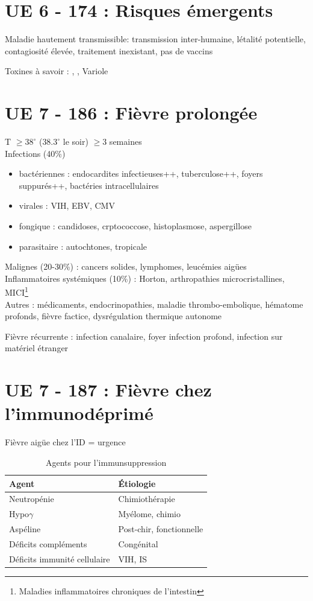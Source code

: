 \section{UE 6 - 174 : Risques émergents}%
\label{sec:item_174_risques_emergents}

Maladie hautement transmissible: transmission inter-humaine, létalité
potentielle, contagiosité élevée, traitement inexistant, pas de vaccins

Toxines à savoir : , , Variole

\section{UE 7 - 186 : Fièvre prolongée}
\label{sec:org0f8d15e}
T \(\ge 38^{\circ}\) (\(38.3^{\circ}\) le soir) \(\ge 3\) semaines\\
Infections (40\%)
\begin{itemize}
\item bactériennes : endocardites infectieuses++, tuberculose++, foyers suppurés++, bactéries intracellulaires
\item virales : VIH, EBV, CMV
\item fongique : candidoses, crptococcose, histoplasmose, aspergillose
\item parasitaire : autochtones, tropicale
\end{itemize}
Malignes (20-30\%) : cancers solides, lymphomes, leucémies aigües\\
Inflammatoires systémiques (10\%) : Horton, arthropathies microcristallines,
MICI\footnote{Maladies inflammatoires chroniques de l'intestin}\\
Autres : médicaments, endocrinopathies, maladie thrombo-embolique, hématome profonds, fièvre factice, dysrégulation thermique autonome

Fièvre récurrente : infection canalaire, foyer infection profond, infection sur matériel étranger

\section{UE 7 - 187 : Fièvre chez l'immunodéprimé}
\label{sec:org3e1654b}
Fièvre aigüe chez l'ID = urgence \skull

\begin{table}[htbp]
\caption{Agents pour l'immunsuppression}
\centering
\begin{tabular}{ll}
Agent & Étiologie\\
\hline
Neutropénie & Chimiothérapie\\
Hypo\(\gamma\) & Myélome, chimio\\
Aspéline & Post-chir, fonctionnelle\\
Déficits compléments & Congénital\\
Déficits immunité cellulaire & VIH, IS\\
\end{tabular}
\end{table}

